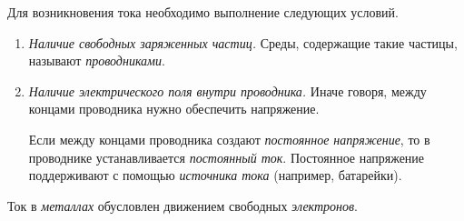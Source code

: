 \documentclass[main.tex]{subfiles}
\begin{document}
Для возникновения тока необходимо выполнение следующих условий.
\begin{enumerate}
    \item \emph{Наличие свободных заряженных частиц.} Среды, содержащие такие частицы, называют \emph{проводниками}.

    \item \emph{Наличие электрического поля внутри проводника.} Иначе говоря, между концами проводника нужно обеспечить напряжение.

    Если между концами проводника создают \emph{постоянное напряжение}, то в проводнике устанавливается \emph{постоянный ток}. Постоянное напряжение поддерживают с помощью \emph{источника тока} (например, батарейки).
\end{enumerate}

Ток в \emph{металлах} обусловлен движением свободных \emph{электронов}.









 
\end{document}
